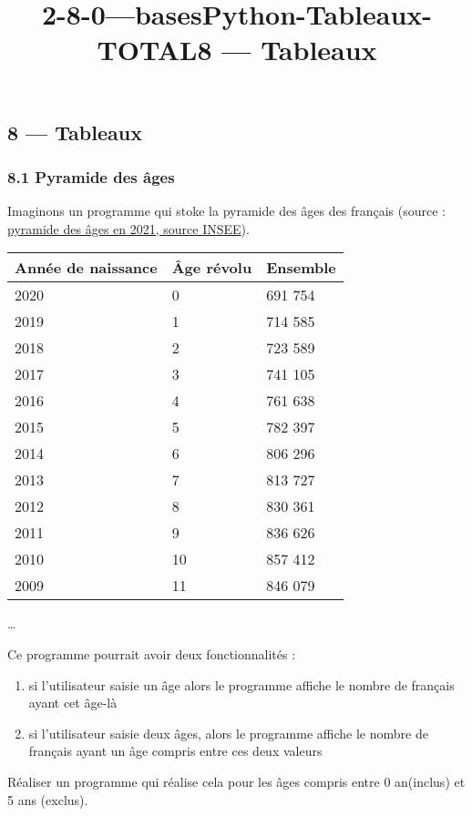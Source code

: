 \documentclass[a4paper,17pt]{extarticle}
\title{2-8-0---basesPython-Tableaux-TOTAL}
\providecommand{\tightlist}{%
      \setlength{\itemsep}{0pt}\setlength{\parskip}{0pt}}
\begin{document}
    
    \title{8 --- Tableaux}

    
    

    
    \hypertarget{tableaux}{%
\subsection{8 --- Tableaux}\label{tableaux}}

    \hypertarget{pyramide-des-uxe2ges}{%
\subsubsection{8.1 Pyramide des âges}\label{pyramide-des-uxe2ges}}

    Imaginons un programme qui stoke la pyramide des âges des français
(source : \href{https://www.insee.fr/fr/statistiques/2381472}{pyramide
des âges en 2021, source INSEE}).

    \begin{longtable}[]{@{}lll@{}}
\toprule
Année de naissance & Âge révolu & Ensemble\tabularnewline
\midrule
\endhead
2020 & 0 & 691 754\tabularnewline
2019 & 1 & 714 585\tabularnewline
2018 & 2 & 723 589\tabularnewline
2017 & 3 & 741 105\tabularnewline
2016 & 4 & 761 638\tabularnewline
2015 & 5 & 782 397\tabularnewline
2014 & 6 & 806 296\tabularnewline
2013 & 7 & 813 727\tabularnewline
2012 & 8 & 830 361\tabularnewline
2011 & 9 & 836 626\tabularnewline
2010 & 10 & 857 412\tabularnewline
2009 & 11 & 846 079\tabularnewline
\bottomrule
\end{longtable}

\ldots{}

    Ce programme pourrait avoir deux fonctionnalités :

\begin{enumerate}
\def\labelenumi{\arabic{enumi}.}
\tightlist
\item
  si l'utilisateur saisie un âge alors le programme affiche le nombre de
  français ayant cet âge-là
\item
  si l'utilisateur saisie deux âges, alors le programme affiche le
  nombre de français ayant un âge compris entre ces deux valeurs
\end{enumerate}

    Réaliser un programme qui réalise cela pour les âges compris entre 0
an(inclus) et 5 ans (exclus).
\end{document}
